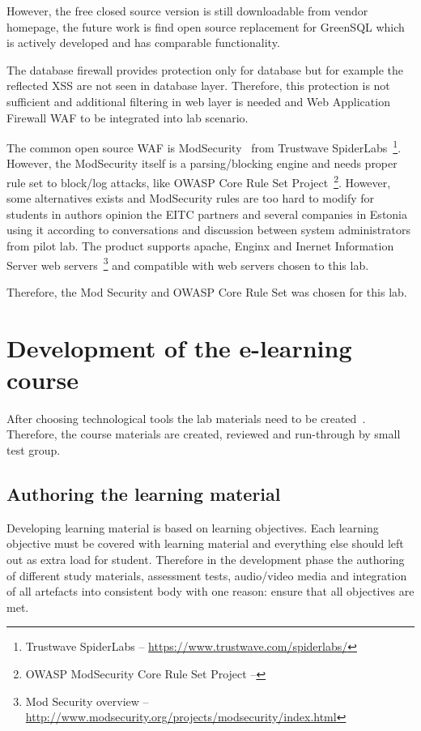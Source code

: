 However, the free closed source version is still downloadable from vendor homepage, the future work is find open source replacement for GreenSQL which is actively developed and has comparable functionality.

The database firewall provides protection only for database but for example the reflected \gls{XSS} are not seen in database layer. Therefore, this protection is not sufficient and additional filtering in web layer is needed and Web Application Firewall \gls{WAF} to be integrated into lab scenario.

The common open source \gls{WAF} is ModSecurity~\citep[p.196]{book:practica_intrusion_analysis} from Trustwave SpiderLabs~\footnote{Trustwave SpiderLabs -- \url{https://www.trustwave.com/spiderlabs/}}. However, the ModSecurity itself is a parsing/blocking engine and needs proper rule set to block/log attacks, like \gls{OWASP} Core Rule Set Project~\footnote{OWASP ModSecurity Core Rule Set Project -- }. However, some alternatives exists and ModSecurity rules are too hard to modify for students in authors opinion the \gls{EITC} partners and several companies in Estonia using it according to conversations and discussion between system administrators from pilot lab. The product supports apache, Enginx and Inernet Information Server web servers~\footnote{Mod Security overview -- \url{http://www.modsecurity.org/projects/modsecurity/index.html}} and compatible with web servers chosen to this lab.

Therefore, the Mod Security and \gls{OWASP} Core Rule Set was chosen for this lab.



\section{Development of the e-learning course}
After choosing technological tools the lab materials need to be created~\citep{OppeArenduskeskus2010}. Therefore, the course materials are created, reviewed and run-through by small test group.

\subsection{Authoring the learning material}
Developing learning material is based on learning objectives. Each learning objective must be covered with learning material and everything else should left out as extra load for student. Therefore in the development phase the authoring of different study materials, assessment tests, audio/video media and integration of all artefacts into consistent body with one reason: ensure that all objectives are met.

